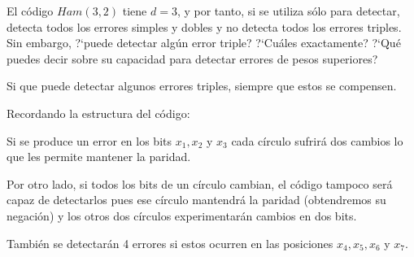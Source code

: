 \begin{problem}[8]
El código $Ham(3,2)$ tiene $d=3$, y por tanto, si se
utiliza sólo para detectar, detecta todos los errores simples y
dobles y no detecta todos los errores triples. Sin embargo,
?`puede detectar algún error triple? ?`Cuáles exactamente? ?`Qué
puedes decir sobre su capacidad para detectar errores de pesos
superiores?

\solution


Si que puede detectar algunos errores triples, siempre que estos se compensen.

Recordando la estructura del código:

\begin{minipage}{0.57\textwidth}
Si se produce un error en los bits $x_1,x_2$ y $x_3$ cada círculo sufrirá dos cambios lo que les permite mantener la paridad.


Por otro lado, si todos los bits de un círculo cambian, el código tampoco será capaz de detectarlos pues ese círculo mantendrá la paridad (obtendremos su negación) y los otros dos círculos experimentarán cambios en dos bits.

También se detectarán 4 errores si estos ocurren en las posiciones $x_4,x_5,x_6$ y $x_7$.
\end{minipage}
\begin{minipage}{0.42\textwidth}
\begin{center}
\end{center}
\end{minipage}
\end{problem}

